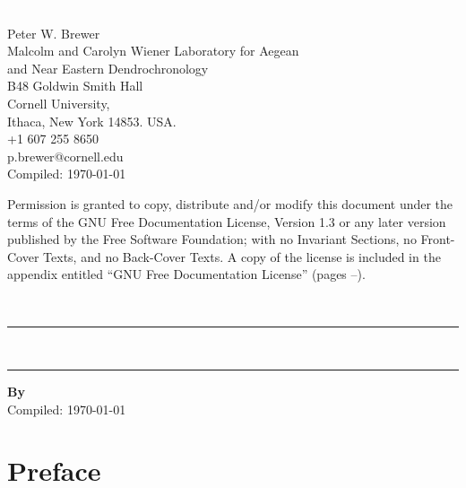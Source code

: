 


\thispagestyle{empty} 
\includegraphics{Images/pixel.png}
\vfill
\parbox[b]{11cm}{\raggedright

\textcopyright {\the\year} Peter W. Brewer\\ Malcolm and Carolyn Wiener Laboratory for Aegean\\ and Near Eastern Dendrochronology \\
B48 Goldwin Smith Hall\\ Cornell University, \\ Ithaca, New York 14853. USA.\\[0.5cm] \Telefon\hspace{3mm}+1 607 255 8650 \\ \Letter\hspace{3mm}p.brewer@cornell.edu\\[5mm] Compiled: \today\\[10mm]}

{\footnotesize 
Permission is granted to copy, distribute and/or modify this document
under the terms of the GNU Free Documentation License, Version 1.3
or any later version published by the Free Software Foundation;
with no Invariant Sections, no Front-Cover Texts, and no Back-Cover Texts.
A copy of the license is included in the appendix entitled ``GNU Free Documentation License'' (pages \pageref{txt:FDLStart}--\pageref{txt:FDLEnd}).}



\newpage
{}
\setcounter{page}{1}
\thispagestyle{empty} 
{ \includegraphics{Images/pixel.png}\\[4cm] 
\hrule 
\vspace{5mm}
\Huge \bfseries \thetitle\\[3mm] 
\large{\thesubtitle}
\vspace{5mm}
\hrule
\vspace{3cm}
}
{
\normalsize
\textbf{By \authornames}\\[0.6cm]
}
{
\vfill
\footnotesize
Compiled: \today
}

\newpage


\tableofcontents


\cleardoublepage
{} 

\section*{Preface}
\thispagestyle{empty} 

